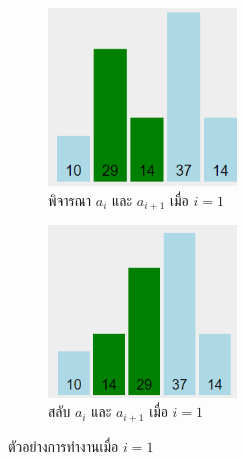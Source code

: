 \begin{figure}[h!]
	\centering
    \begin{subfigure}{.5\textwidth}
    	\centering
        \includegraphics[width=5cm]{images/bubble_sort_2-3}
        \caption{พิจารณา $a_i$ และ $a_{i+1}$ เมื่อ $i=1$}
        \label{fig:bubble_sort_2-3}
    \end{subfigure}%
    \begin{subfigure}{.5\textwidth}
    	\centering
        \includegraphics[width=5cm]{images/bubble_sort_2-3-swap}
        \caption{สลับ $a_i$ และ $a_{i+1}$ เมื่อ $i=1$}
        \label{fig:bubble_sort_2-3-swap}
    \end{subfigure}
    \caption{ตัวอย่างการทำงานเมื่อ $i=1$}
    \label{fig:bubble_sort_round-1-1}
\end{figure}


